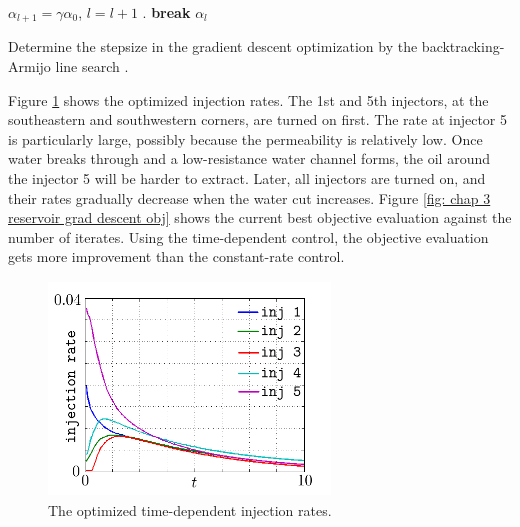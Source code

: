 \begin{algorithm}[htbp]
\begin{algorithmic}[1]
        \STATE $\alpha_{l+1} = \gamma \alpha_0$, $l=l+1$ .
            \STATE \textbf{break}
        \ENDIF
    \ENDFOR
\ENSURE $\alpha_{l}$
\end{algorithmic}
\caption{Determine the stepsize in the gradient descent optimization by 
         the backtracking-Armijo line search \cite{backtrack line search}.}
\label{alg: Armijo}
\end{algorithm}


Figure \ref{fig: chap 3 reservoir opt inj} shows the optimized injection rates.
The 1st and 5th injectors, at the southeastern and southwestern corners, are turned on first.
The rate at injector 5 is particularly large, possibly because the permeability is relatively low.
Once water breaks through and a low-resistance water channel forms, the oil around the 
injector 5 will be 
harder to extract. Later, all injectors are turned on, and their rates gradually decrease
when the water cut increases. Figure \ref{fig: chap 3 reservoir grad descent obj} shows the
current best objective evaluation against the number of iterates. Using the 
time-dependent control, the objective 
evaluation gets more improvement than the constant-rate control.


\begin{figure}[htbp]\begin{center}
    \includegraphics[width=7.5cm,height=5.7cm]{../optinj.png}
    \caption{The optimized time-dependent injection rates.}
    \label{fig: chap 3 reservoir opt inj}
\end{center}\end{figure}



